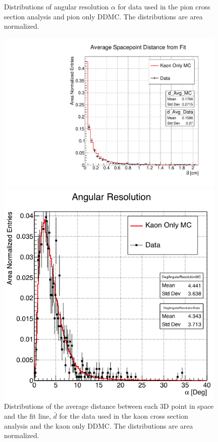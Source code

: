 \begin{figure}[ht]
\begin{minipage}[t]{0.45\linewidth}
\caption[]{Distributions of angular resolution $\alpha$ for data used in the pion cross section analysis and pion only DDMC. The distributions are area normalized. } \label{fig:trackingResolution}
\end{minipage}
\end{figure}



	
	

\begin{figure}[ht]
\begin{minipage}[t]{0.45\linewidth}
\centering
\includegraphics[width=\textwidth]{Chapter-5/Images/DavgKaons.pdf}
\caption[]{Distributions of the average distance between each 3D point in space and the fit line,  $\bar d$ for the data used in the kaon cross section analysis and the kaon only DDMC. The distributions are area normalized. } \label{fig:Chi2AllPtsK}
\end{minipage}
\hspace{0.5cm}
\begin{minipage}[t]{0.45\linewidth}
\centering
\includegraphics[width=\textwidth]{Chapter-5/Images/KaonAngRes.png}

\end{minipage}
\end{figure}
